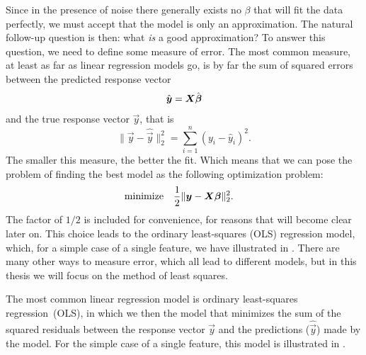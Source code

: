 Since in the presence of noise there generally exists no \(\beta\) that will fit the data perfectly, we must accept that the model is only an approximation. The natural follow-up question is then: what \emph{is} a good approximation? To answer this question, we need to define some measure of error. The most common measure, at least as far as linear regression models go, is by far the sum of squared errors between the predicted response vector
\[
  \hat{\boldsymbol{y}} = \boldsymbol{X}\hat{\boldsymbol{\beta}}
\]
and the true response vector \(\vec{y}\), that is
\[
  \lVert \vec{y} - \hat{\vec{y}}\rVert^2_2 = \sum_{i=1}^n (y_i - \hat{y}_i)^2.
\]
The smaller this measure, the better the fit. Which means that we can pose the problem of finding the best model as the following optimization problem:
\[
  \begin{aligned}
     & \text{minimize} &  & \frac{1}{2} \lVert \boldsymbol{y} - \boldsymbol{X}\boldsymbol{\beta}\rVert^2_2.
  \end{aligned}
\]
The factor of \(1/2\) is included for convenience, for reasons that will become clear later on.
This choice leads to the ordinary least-squares (OLS) regression model, which, for a simple case of a single feature, we have illustrated in . There are many other ways to measure error, which all lead to different models, but in this thesis we will focus on the method of least squares.

The most common linear regression model is ordinary least-squares regression~(OLS), in which we  then the model that minimizes the sum of the squared residuals between the response vector \(\vec{y}\) and the predictions (\(\hat{\vec{y}}\)) made by the model. For the simple case of a single feature, this model is illustrated in .


